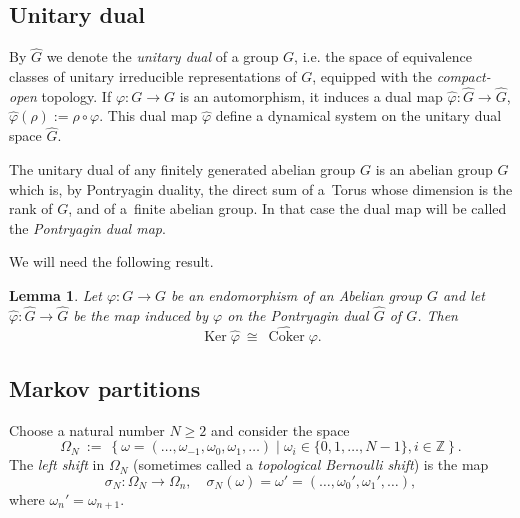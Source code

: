 \documentclass[oneside]{amsart}
\def\Z{\mathbb{Z}}
\def\Ker{\operatorname{Ker}}
\def\Coker{\operatorname{Coker}}
\newcommand{\wh}[1]{\widehat{#1}}
\newtheorem{lem}[thm]{Lemma}
\begin{document}
\subsection{Unitary dual}

By $\wh G$ we denote the \emph{unitary dual} of a group $G$, i.e.
the space of equivalence classes of
unitary irreducible representations of $G$, equipped with the
\emph{compact-open} topology.
If $\varphi: G\to G$ is an automorphism,
it induces a dual map $\wh\varphi:\wh G\to\wh G$, $\wh\varphi (\rho) := \rho \circ \varphi$.
This dual map $\wh\varphi$ define a dynamical system  on the unitary dual space $\widehat{G}$.

The unitary dual of any finitely generated abelian group $G$ is an abelian group $\wh G$ which is,
by Pontryagin duality, the direct sum
of a~Torus whose dimension is the rank of $G$, and of a~finite abelian group.
In that case the dual map will be called the \emph{Pontryagin dual map}.

We will need the following result.

\begin{lem} \cite[Proposition 1]{FelHil} \label{thm:FelHil-dual}
  Let $\varphi:G\to G$ be an endomorphism of an Abelian group $G$
  and let $\wh \varphi: \wh G \to \wh G$ be the map induced by $\varphi$
  on the Pontryagin dual $\wh G$ of $G$.
  Then
  \begin{equation*}
    \Ker \wh \varphi \ \cong \ \wh \Coker \varphi.
  \end{equation*}
\end{lem}




\subsection{Markov partitions}

Choose a natural number $N \geq 2$ and consider the space
\begin{equation*}
  \Omega_N \ := \ \left\{ \omega = (\ldots,\omega_{-1},\omega_0,\omega_1,\ldots) \; | \; \omega_i \in \{0,1,\ldots,N-1\}, i \in \Z \right\}.
\end{equation*}
The \emph{left shift} in $\Omega_N$ (sometimes called a \emph{topological Bernoulli shift}) is the map
\begin{equation*}
  \sigma_N: \Omega_N \to \Omega_n, \quad \sigma_N(\omega) = \omega' = (\ldots,\omega_0',\omega_1',\ldots),
\end{equation*}
where $\omega_n' = \omega_{n+1}$.
\end{document}
